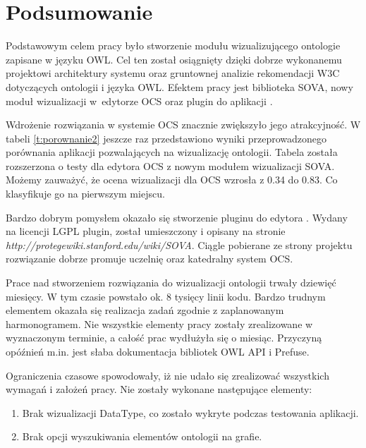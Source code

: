 \chapter{Podsumowanie}

Podstawowym celem pracy było stworzenie modułu wizualizującego ontologie zapisane w języku OWL.  Cel ten został osiągnięty dzięki dobrze wykonanemu projektowi 
architektury systemu oraz gruntownej analizie rekomendacji W3C dotyczących ontologii i języka OWL.  Efektem pracy jest biblioteka SOVA, nowy moduł wizualizacji 
w~edytorze OCS oraz plugin do aplikacji \protege. 
\par
Wdrożenie rozwiązania w systemie OCS znacznie zwiększyło jego atrakcyjność. W tabeli \ref{t:porownanie2} jeszcze raz przedstawiono wyniki przeprowadzonego porównania 
aplikacji pozwalających na wizualizację ontologii. Tabela została rozszerzona o testy dla edytora OCS z nowym modułem wizualizacji SOVA. Możemy zauważyć, że ocena 
wizualizacji dla OCS wzrosła z 0.34 do 0.83. Co klasyfikuje go na pierwszym miejscu. 
\par 
Bardzo dobrym pomysłem okazało się  stworzenie pluginu do edytora \protege. Wydany na licencji LGPL plugin, został umieszczony i opisany na stronie \textit{http://protegewiki.stanford.edu/wiki/SOVA}.
Ciągle pobierane ze strony projektu rozwiązanie dobrze promuje uczelnię oraz katedralny system OCS. 
\par
Prace nad stworzeniem rozwiązania do wizualizacji ontologii trwały dziewięć miesięcy. W tym czasie powstało ok. 8 tysięcy linii kodu. 
Bardzo trudnym elementem okazała się realizacja zadań zgodnie z zaplanowanym harmonogramem. Nie wszystkie elementy pracy zostały zrealizowane w wyznaczonym terminie, 
a całość prac wydłużyła się o miesiąc. Przyczyną opóźnień m.in. jest słaba dokumentacja bibliotek OWL API i Prefuse.  
\par
Ograniczenia czasowe spowodowały, iż nie udało się zrealizować wszystkich wymagań i założeń pracy. Nie zostały wykonane następujące elementy:
\begin{enumerate}
 \item Brak wizualizacji DataType, co zostało wykryte podczas testowania aplikacji.
 \item Brak opcji wyszukiwania elementów ontologii na grafie. 
\end{enumerate}

